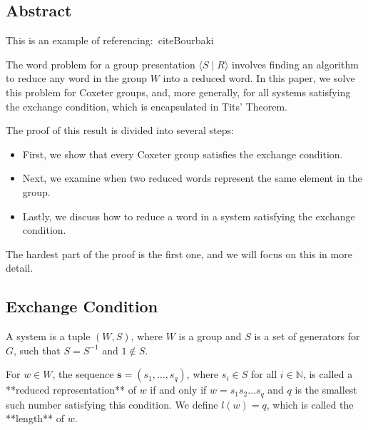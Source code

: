 \documentclass[../main.tex]{subfiles}
\begin{document}
\setcounter{subsection}{-1}
\subsection{Abstract}


This is an example of referencing:~cite{Bourbaki}\cite{Davis}

The word problem for a group presentation \( \langle S \mid R \rangle \) involves finding an algorithm to reduce any word in the group \( W \) into a reduced word. In this paper, we solve this problem for Coxeter groups, and, more generally, for all systems satisfying the exchange condition, which is encapsulated in Tits' Theorem.

The proof of this result is divided into several steps:

\begin{itemize} 
    \item First, we show that every Coxeter group satisfies the exchange condition.
    \item Next, we examine when two reduced words represent the same element in the group.
    \item Lastly, we discuss how to reduce a word in a system satisfying the exchange condition.
\end{itemize}

The hardest part of the proof is the first one, and we will focus on this in more detail.

\subsection{Exchange Condition}
\begin{definition}
    A system is a tuple \( (W, S) \), where \( W \) is a group and \( S \) is a set of generators for \( G \), such that \( S = S^{-1} \) and \( 1 \notin S \). 
\end{definition}
    
\begin{definition}
    For \( w \in W \), the sequence \( \mathbf{s} = (s_1, \dots, s_q) \), where \( s_i \in S \) for all \( i \in \mathbb{N} \), is called a **reduced representation** of \( w \) if and only if \( w = s_1 s_2 \dots s_q \) and \( q \) is the smallest such number satisfying this condition. We define \( l(w) = q \), which is called the **length** of \( w \).
\end{definition}
\end{document}
